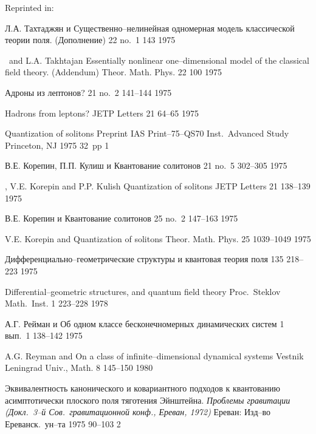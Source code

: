 Reprinted in: \fy{}

{Л.А. Тахтаджян и \LD}
{Существенно--нелинейная одномерная модель классической теории поля. (Дополнение)}
{\TMF} {22} {no.~1} {143} {1975}

{\LF\ and L.A. Takhtajan}
{Essentially nonlinear one--dimensional model of the classical
 field theory. (Addendum)}
{Theor. Math. Phys.} {22} {100} {1975}

{\LD}
{Адроны из лептонов?}
{\LZ} {21} {no.~2} {141--144} {1975}

{\LF}
{Hadrons from leptons?}
{JETP Letters} {21} {64--65} {1975}

{\LF}
{Quantization of solitons}
{Preprint IAS Print--75--QS70} {Inst.\ Advanced Study} {Princeton, NJ}
{1975} {} {32~pp} {1}

{В.Е. Корепин, П.П. Кулиш и \LD}
{Квантование солитонов}
{\LZ} {21} {no.~5} {302--305} {1975}

{\LF, V.E. Korepin and P.P. Kulish}
{Quantization of solitons}
{JETP Letters} {21} {138--139} {1975}

{В.Е. Корепин и \LD}
{Квантование солитонов}
{\TMF} {25} {no.~2} {147--163} {1975}

{V.E. Korepin and \LF}
{Quantization of solitons}
{Theor. Math. Phys.} {25} {1039--1049} {1975}

{\LD}
{Дифференциально--геометрические структуры и квантовая теория поля}
{\Trudy} {135} {} {218--223} {1975}

{\LF}
{Differential--geometric structures, and quantum field theory}
{Proc.\ Steklov Math.\ Inst.} {1} {223--228} {1978}

{А.Г. Рейман и \LD}
{Об одном классе бесконечномерных динамических систем}
{\Vestnik} {1} {вып.~1}  {138--142} {1975}

{A.G. Reyman and \LF}
{On a class of infinite--dimensional dynamical systems}
{Vestnik Leningrad Univ., Math.} {8} {145--150} {1980}

{\LD}
{Эквивалентность канонического и ковариантного подходов к
квантованию асимптотически плоского поля тяготения Эйнштейна.}
{\em Проблемы гравитации (Докл.\ 3--й Сов.\ гравитационной
 конф., Ереван, 1972)} {Ереван: Изд--во Ереванск.\ ун--та} {} {1975} {} {90--103} {2}

